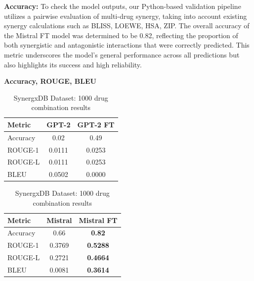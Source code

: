 \documentclass[11pt]{article}
\begin{document}
\textbf{Accuracy:} To check the model outputs, our Python-based validation pipeline utilizes a pairwise evaluation of multi-drug synergy, taking into account existing synergy calculations such as BLISS, LOEWE, HSA, ZIP. The overall accuracy of the Mistral FT model was determined to be 0.82, reflecting the proportion of both synergistic and antagonistic interactions that were correctly predicted. This metric underscores the model's general performance across all predictions but also highlights its success and high reliability.

\begin{table}[ht]
\centering
\caption{SynergxDB Dataset: 1000 drug combination results}
\label{table:result}
\textbf{Accuracy, ROUGE, BLEU}
\par\medskip %
\begin{tabular}{|l|c|c|}
\hline
\textbf{Metric} & \textbf{GPT-2} & \textbf{GPT-2 FT} \\
\hline
Accuracy & 0.02 & 0.49 \\
ROUGE-1 & 0.0111 & 0.0253 \\
ROUGE-L & 0.0111 & 0.0253 \\
BLEU & 0.0502 & 0.0000 \\
\hline
\end{tabular}
\par\medskip %
\begin{tabular}{|l|c|c|}
\hline
\textbf{Metric} & \textbf{Mistral} & \textbf{Mistral FT} \\
\hline
Accuracy & 0.66 & \textbf{0.82} \\
ROUGE-1 & 0.3769 & \textbf{0.5288} \\
ROUGE-L & 0.2721 & \textbf{0.4664} \\
BLEU & 0.0081 & \textbf{0.3614} \\
\hline
\end{tabular}
\end{table}
\end{document}
